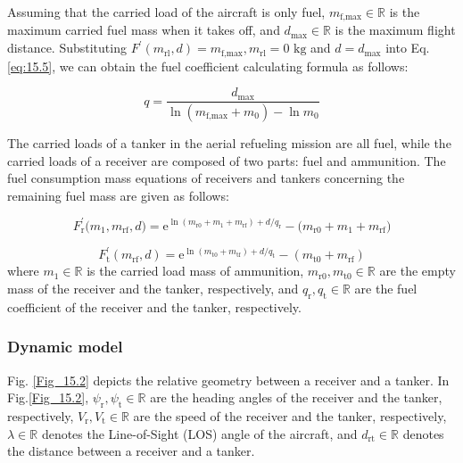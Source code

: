 Assuming that the carried load of the aircraft is only fuel, $m_\text{f,max}\in\mathbb{R}$ is the maximum carried fuel mass when it takes off, and $d_\text{max}\in\mathbb{R}$ is the maximum flight distance. Substituting $F^{\prime}(m_{\text{rl}},d)=m_{\text{f,max}},m_{\text{rl}}=0\text{~kg}$ and $d=d_\text{max}$ into Eq.\ref{eq:15.5}, we can obtain the fuel coefficient calculating formula as follows:

\begin{equation}
q=\frac{d_\text{max}}{\ln(m_\text{f,max}+m_0)-\ln m_0}
\label{eq:15.6}
\end{equation}	

The carried loads of a tanker in the aerial refueling mission are all fuel, while the carried loads of a receiver are composed of two parts: fuel and ammunition. The fuel consumption mass equations of receivers and tankers concerning the remaining fuel mass are given as follows:

\begin{equation}
F_\text{r}^{\prime}\big(m_1,m_\text{rf},d\big)=\text{e}^{\ln\left(m_\text{r0}+m_1+m_\text{rf}\right)+d/q_\text{r}}-\big(m_\text{r0}+m_1+m_\text{rf}\big)
\label{eq:15.7}
\end{equation}	 

\begin{equation}
F_{\text{t}}^{\prime}(m_{\text{rf}},d)=\text{e}^{\ln(m_{\text{t}0}+m_{\text{tf}})+d/q_{\text{t}}}-\left(m_{\text{t}0}+m_{\text{rf}}\right)
\label{eq:15.8}
\end{equation}	 
where $m_\text{1}\in\mathbb{R}$ is the carried load mass of ammunition, $m_\text{r0},m_\text{t0}\in\mathbb{R}$ are the empty mass of the receiver and the tanker, respectively, and $q_\text{r},q_\text{t}\in\mathbb{R}$ are the fuel coefficient of the receiver and the tanker, respectively.







\subsubsection{Dynamic model}

Fig. \ref{Fig_15.2} depicts the relative geometry between a receiver and a tanker. In Fig.\ref{Fig_15.2}, $\psi_{\text{r}},\psi_{\text{t}}\in\mathbb{R}$ are the heading angles  of the receiver and the tanker, respectively, $V_{\text{r}},V_{\text{t}}\in\mathbb{R}$ are the speed of the receiver and the tanker, respectively, $\lambda\in\mathbb{R}$ denotes the Line-of-Sight (LOS) angle of the aircraft, and $d_{\text{rt}}\in\mathbb{R}$ denotes the distance between a receiver and a tanker. 

